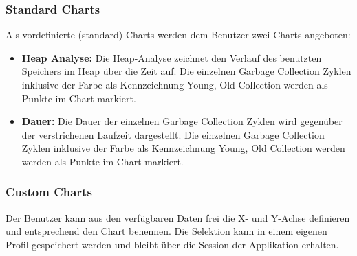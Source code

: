 \subsubsection{Standard Charts}
Als vordefinierte (standard) Charts werden dem Benutzer zwei Charts angeboten:
\begin{itemize}
	\item \textbf{Heap Analyse:} Die Heap-Analyse zeichnet den Verlauf des benutzten Speichers im Heap über die Zeit auf. Die einzelnen Garbage Collection Zyklen inklusive der Farbe als Kennzeichnung Young, Old Collection werden als Punkte im Chart markiert.
	\item \textbf{Dauer:} Die Dauer der einzelnen Garbage Collection Zyklen wird gegenüber der verstrichenen Laufzeit dargestellt. Die einzelnen Garbage Collection Zyklen inklusive der Farbe als Kennzeichnung Young, Old Collection werden werden als Punkte im Chart markiert.
\end{itemize}

\subsubsection{Custom Charts}
Der Benutzer kann aus den verfügbaren Daten frei die X- und Y-Achse definieren und entsprechend den Chart benennen. Die Selektion kann in einem eigenen Profil gespeichert werden und bleibt über die Session der Applikation erhalten.




